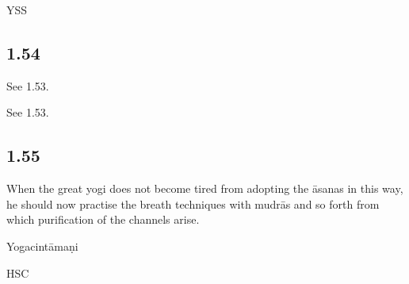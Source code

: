 \begin{ekdosis}
\begin{testimonia}[hp01_053]
YSS

\begin{versinnote}
\end{versinnote}

\end{testimonia}

\subsection*{1.54}
\begin{sources}[hp01_054]
See 1.53.
\end{sources}
\begin{testimonia}[hp01_054]
See 1.53.
\end{testimonia}


\subsection*{1.55}
\begin{translation}[hp01_055]
When the great yogi does not become tired from adopting the āsanas in this way, he should now practise the breath techniques with mudrās and so forth from which purification of the channels arise.
\end{translation}

\begin{sources}[hp01_055]
\end{sources}

\begin{testimonia}[hp01_055]
Yogacintāmaṇi

\begin{versinnote}
\end{versinnote}

HSC

\begin{versinnote}
\end{versinnote}


\end{testimonia}
\end{ekdosis}
